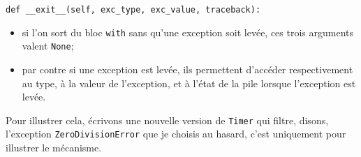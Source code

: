 \begin{verbatim}
def __exit__(self, exc_type, exc_value, traceback):
\end{verbatim}

\begin{itemize}
\tightlist
\item
  si l'on sort du bloc \texttt{with} sans qu'une exception soit levée,
  ces trois arguments valent \texttt{None};
\item
  par contre si une exception est levée, ils permettent d'accéder
  respectivement au type, à la valeur de l'exception, et à l'état de la
  pile lorsque l'exception est levée.
\end{itemize}

    Pour illustrer cela, écrivons une nouvelle version de \texttt{Timer} qui
filtre, disons, l'exception \texttt{ZeroDivisionError} que je choisis au
hasard, c'est uniquement pour illustrer le mécanisme.

